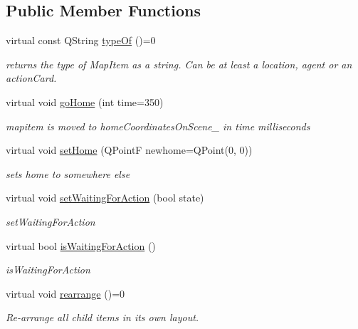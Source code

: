 \subsection*{Public Member Functions}
\begin{DoxyCompactItemize}
\item 
virtual const Q\-String \hyperlink{classmap_item_ac34ad651be6151f9ca9cc6310d1f6462}{type\-Of} ()=0
\begin{DoxyCompactList}\small\item\em returns the type of Map\-Item as a string. Can be at least a location, agent or an action\-Card. \end{DoxyCompactList}\item 
virtual void \hyperlink{classmap_item_a4186737ffce9680d0ba0bc0130533f26}{go\-Home} (int time=350)
\begin{DoxyCompactList}\small\item\em mapitem is moved to home\-Coordinates\-On\-Scene\-\_\- in time milliseconds \end{DoxyCompactList}\item 
virtual void \hyperlink{classmap_item_ab8ed715abe71e4197937c57dbca8628c}{set\-Home} (Q\-Point\-F newhome=Q\-Point(0, 0))
\begin{DoxyCompactList}\small\item\em sets home to somewhere else \end{DoxyCompactList}\item 
virtual void \hyperlink{classmap_item_a1b50fc0ce2d93062c677fd8bcda29ac2}{set\-Waiting\-For\-Action} (bool state)
\begin{DoxyCompactList}\small\item\em set\-Waiting\-For\-Action \end{DoxyCompactList}\item 
virtual bool \hyperlink{classmap_item_a9aa8e530e9f2b8121cddff2d811cb477}{is\-Waiting\-For\-Action} ()
\begin{DoxyCompactList}\small\item\em is\-Waiting\-For\-Action \end{DoxyCompactList}\item 
\hypertarget{classmap_item_a7fb148237b42f68d844f9318311b20bd}{virtual void \hyperlink{classmap_item_a7fb148237b42f68d844f9318311b20bd}{rearrange} ()=0}\label{classmap_item_a7fb148237b42f68d844f9318311b20bd}

\begin{DoxyCompactList}\small\item\em Re-\/arrange all child items in its own layout. \end{DoxyCompactList}\end{DoxyCompactItemize}
